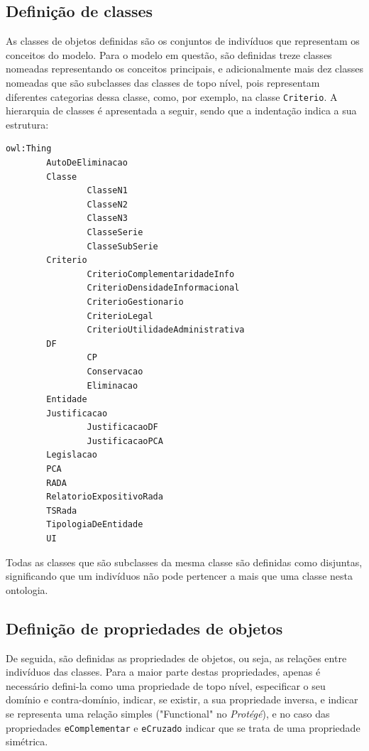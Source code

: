 \documentclass{article}
\begin{document}
\subsection{Definição de classes}

As classes de objetos definidas são os conjuntos de indivíduos que representam os conceitos do modelo. Para o modelo em questão, são definidas treze classes nomeadas representando os conceitos principais, e adicionalmente mais dez classes nomeadas que são subclasses das classes de topo nível, pois representam diferentes categorias dessa classe, como, por exemplo, na classe \texttt{Criterio}. A hierarquia de classes é apresentada a seguir, sendo que a indentação indica a sua estrutura:

\begin{verbatim}
owl:Thing
        AutoDeEliminacao
        Classe
                ClasseN1
                ClasseN2
                ClasseN3
                ClasseSerie
                ClasseSubSerie
        Criterio
                CriterioComplementaridadeInfo
                CriterioDensidadeInformacional
                CriterioGestionario
                CriterioLegal
                CriterioUtilidadeAdministrativa
        DF
                CP
                Conservacao
                Eliminacao
        Entidade
        Justificacao
                JustificacaoDF
                JustificacaoPCA
        Legislacao
        PCA
        RADA
        RelatorioExpositivoRada
        TSRada
        TipologiaDeEntidade
        UI
\end{verbatim}

Todas as classes que são subclasses da mesma classe são definidas como disjuntas, significando que um indivíduos não pode pertencer a mais que uma classe nesta ontologia.

\subsection{Definição de propriedades de objetos}

De seguida, são definidas as propriedades de objetos, ou seja, as relações entre indivíduos das classes. Para a maior parte destas propriedades, apenas é necessário defini-la como uma propriedade de topo nível, especificar o seu domínio e contra-domínio, indicar, se existir, a sua propriedade inversa, e indicar se representa uma relação simples ("Functional" no \emph{Protégé}), e no caso das propriedades \texttt{eComplementar} e \texttt{eCruzado} indicar que se trata de uma propriedade simétrica.
\end{document}
